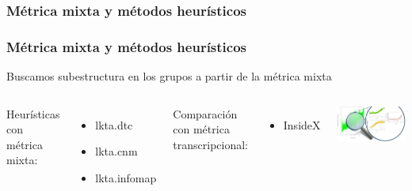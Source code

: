 \documentclass[serif,9pt, t]{beamer}
\begin{document}
\subsubsection*{Métrica mixta y métodos heurísticos}
\begin{frame}\frametitle{Métrica mixta y métodos heurísticos} 
\bigskip
\centering
Buscamos subestructura en los grupos a partir de la métrica mixta\\
\vspace{10pt}
\begin{columns}
\column{\dimexpr\paperwidth-30pt}
\begin{columns}[T]
	Heurísticas con métrica mixta:
	\begin{itemize}
	\item lkta.dtc
	\item lkta.cnm
	\item lkta.infomap
	\end{itemize}
	Comparación con métrica transcripcional:
	\begin{itemize}
		\item InsideX
	\end{itemize}
	\vspace{10pt}
	\centering
	\includegraphics[width=1\textwidth]{lupa_chica.png}
\end{columns}
\end{columns}
\end{frame}
\end{document}
